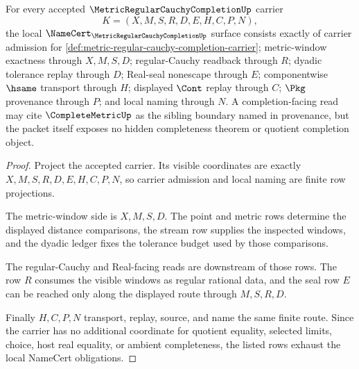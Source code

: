 \begin{theorem}
\label{thm:metric-regular-cauchy-completion-namecert-obligations}
For every accepted $\MetricRegularCauchyCompletionUp$ carrier
$$
K=(X,M,S,R,D,E,H,C,P,N),
$$
the local $\NameCert_{\MetricRegularCauchyCompletionUp}$ surface consists exactly of carrier admission for \autoref{def:metric-regular-cauchy-completion-carrier}; metric-window exactness through $X,M,S,D$; regular-Cauchy readback through $R$; dyadic tolerance replay through $D$; Real-seal nonescape through $E$; componentwise $\hsame$ transport through $H$; displayed $\Cont$ replay through $C$; $\Pkg$ provenance through $P$; and local naming through $N$. A completion-facing read may cite $\CompleteMetricUp$ as the sibling boundary named in provenance, but the packet itself exposes no hidden completeness theorem or quotient completion object.
\end{theorem}
\begin{proof}
Project the accepted carrier. Its visible coordinates are exactly $X,M,S,R,D,E,H,C,P,N$, so carrier admission and local naming are finite row projections.

The metric-window side is $X,M,S,D$. The point and metric rows determine the displayed distance comparisons, the stream row supplies the inspected windows, and the dyadic ledger fixes the tolerance budget used by those comparisons.

The regular-Cauchy and Real-facing reads are downstream of those rows. The row $R$ consumes the visible windows as regular rational data, and the seal row $E$ can be reached only along the displayed route through $M,S,R,D$.

Finally $H,C,P,N$ transport, replay, source, and name the same finite route. Since the carrier has no additional coordinate for quotient equality, selected limits, choice, host real equality, or ambient completeness, the listed rows exhaust the local NameCert obligations.
\end{proof}

